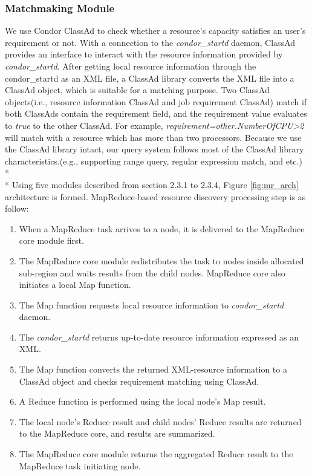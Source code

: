\documentclass{acm_proc_article-sp}
\begin{document}
\subsubsection{Matchmaking Module}
We use Condor ClassAd\cite{classad} to check whether a resource's capacity satisfies an user's requirement or not. 
With a connection to the \textit{condor\_startd} daemon, ClassAd provides an interface to interact with the resource information provided by \textit{condor\_startd}. 
After getting local resource information through the condor\_startd as an XML file, a ClassAd library converts the XML file into a ClassAd object, which is suitable for a matching purpose.
Two ClassAd objects(i.e., resource information ClassAd and job requirement ClassAd) match if both ClassAds contain the requirement field, and the requirement value evaluates to \textit{true} to the other ClassAd. 
For example, \textit{requirement=other.NumberOfCPU>2} will match with a resource which has more than two processors.
Because we use the ClassAd library intact, our query system follows most of the ClassAd library characteristics.(e.g., supporting range query, regular expression match, and etc.)\\*\\*
Using five modules described from section 2.3.1 to 2.3.4, Figure \ref{fig:mr_arch} architecture is formed. MapReduce-based resource discovery processing step is as follow:
\begin{enumerate}
\setlength{\itemsep}{0pt}
\setlength{\parskip}{0pt}
\item When a MapReduce task arrives to a node, it is delivered to the MapReduce core module first.
\item The MapReduce core module redistributes the task to nodes inside allocated sub-region and waits results from the child nodes. MapReduce core also initiates a local Map function.
\item The Map function requests local resource information to \textit{condor\_startd} daemon.
\item The \textit{condor\_startd} returns up-to-date resource information expressed as an XML.
\item The Map function converts the returned XML-resource information to a ClassAd object and checks requirement matching using ClassAd.
\item A Reduce function is performed using the local node's Map result.
\item The local node's Reduce result and child nodes' Reduce results are returned to the MapReduce core, and results are summarized.
\item The MapReduce core module returns the aggregated Reduce result to the MapReduce task initiating node.
\end{enumerate}
\end{document}
